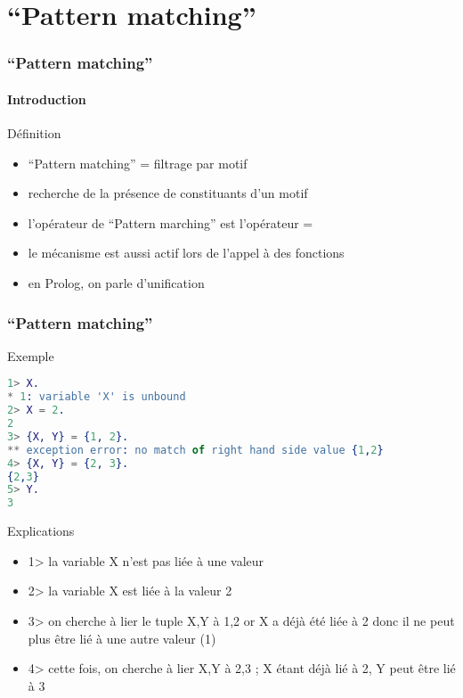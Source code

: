 \section{``Pattern matching''}

\begin{frame}[fragile]
  \frametitle{``Pattern matching''}
  \framesubtitle{Introduction}

  \begin{block}{Définition}
    \begin{itemize}
      \item ``Pattern matching'' = filtrage par motif
      \item recherche de la présence de constituants d'un motif
      \item l'opérateur de ``Pattern marching'' est l'opérateur =
      \item le mécanisme est aussi actif lors de l'appel à des fonctions
      \item en Prolog, on parle d'unification
    \end{itemize}
  \end{block}

\end{frame}

\begin{frame}[fragile]
  \frametitle{``Pattern matching''}

  \begin{exampleblock}{Exemple}
    \begin{lstlisting}[language=erlang]
1> X.
* 1: variable 'X' is unbound
2> X = 2.
2
3> {X, Y} = {1, 2}.
** exception error: no match of right hand side value {1,2}
4> {X, Y} = {2, 3}.
{2,3}
5> Y.
3
    \end{lstlisting}
  \end{exampleblock}

  \begin{alertblock}{Explications}
    \begin{itemize}
    \item 1> la variable X n'est pas liée à une valeur
    \item 2> la variable X est liée à la valeur 2
    \item 3> on cherche à lier le tuple {X,Y} à {1,2} or X a déjà été liée à
      2 donc il ne peut plus être lié à une autre valeur (1)
    \item 4> cette fois, on cherche à lier {X,Y} à {2,3} ; X étant déjà lié à 2,
      Y peut être lié à 3
    \end{itemize}
  \end{alertblock}

\end{frame}

